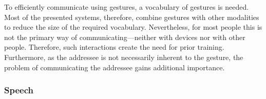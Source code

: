 To efficiently communicate using gestures, a vocabulary of gestures is needed.
Most of the presented systems, therefore, combine gestures with other modalities to reduce the size of the required vocabulary.
Nevertheless, for most people this is not the primary way of communicating---neither with \glspl{device} nor with other people.
Therefore, such interactions create the need for prior training.
Furthermore, as the \gls{addressee} is not necessarily inherent to the gesture, the problem of communicating the \gls{addressee} gains additional importance.

\subsubsection{Speech}\label{sec.rw.hi.focused-dev-rw.speech}

